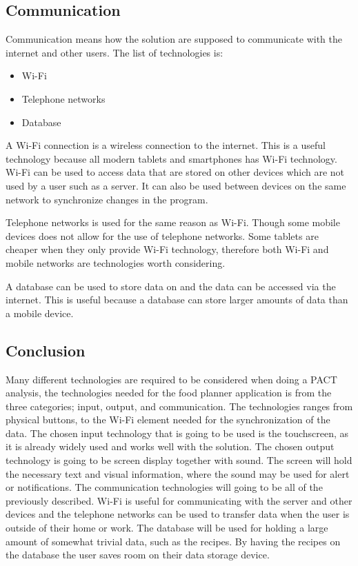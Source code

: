 \subsection{Communication}
Communication means how the solution are supposed to communicate with the internet and other users. The list of technologies is:

\begin{itemize}
	\item Wi-Fi
	\item Telephone networks
    \item Database
\end{itemize}

A Wi-Fi connection is a wireless connection to the internet.
This is a useful technology because all modern tablets and smartphones has Wi-Fi technology.
Wi-Fi can be used to access data that are stored on other devices which are not used by a user such as a server.
It can also be used between devices on the same network to synchronize changes in the program.    
%

Telephone networks is used for the same reason as Wi-Fi. Though some mobile devices does not allow for the use of telephone networks.
Some tablets are cheaper when they only provide Wi-Fi technology, therefore both Wi-Fi and mobile networks are technologies worth considering.

A database can be used to store data on and the data can be accessed via the internet.
This is useful because a database can store larger amounts of data than a mobile device.
 
\subsection{Conclusion}
Many different technologies are required to be considered when doing a PACT analysis, the technologies needed for the food planner application is from the three categories; input, output, and communication.
The technologies ranges from physical buttons, to the Wi-Fi element needed for the synchronization of the data. The chosen input technology that is going to be used is the touchscreen, as it is already widely used and works well with the solution. The chosen output technology is going to be screen display together with sound. The screen will hold the necessary text and visual information, where the sound may be used for alert or notifications. The communication technologies will going to be all of the previously described. Wi-Fi is useful for communicating with the server and other devices and the telephone networks can be used to transfer data when the user is outside of their home or work. The database will be used for holding a large amount of somewhat trivial data, such as the recipes. By having the recipes on the database the user saves room on their data storage device.